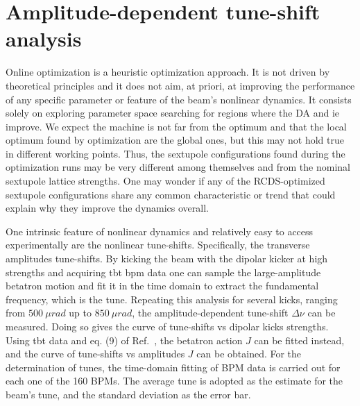 \section{Amplitude-dependent tune-shift analysis}
Online optimization is a heuristic optimization approach. It is not driven by theoretical principles and it does not aim, at priori, at improving the performance of any specific parameter or feature of the beam's nonlinear dynamics. It consists solely on exploring parameter space searching for regions where the \gls*{DA} and \gls*{ie} improve. We expect the machine is not far from the optimum and  that the local optimum found by optimization are the global ones, but this may not hold true in different working points. Thus, the sextupole configurations found during the optimization runs may be very different among themselves and from the nominal sextupole lattice strengths. One may wonder if any of the \gls*{RCDS}-optimized sextupole configurations share any common characteristic or trend that could explain why they improve the dynamics overall.

One intrinsic feature of nonlinear dynamics and relatively easy to access experimentally are the nonlinear tune-shifts. Specifically, the transverse amplitudes tune-shifts. By kicking the beam with the dipolar kicker at high strengths and acquiring \gls*{tbt} \gls*{bpm} data one can sample the large-amplitude betatron motion and fit it in the time domain to extract the fundamental frequency, which is the tune. Repeating this analysis for  several kicks, ranging from $500~\unit{\mu rad}$ up to $850~\unit{\mu rad}$, the amplitude-dependent tune-shift $\Delta\nu$ can be measured. Doing so gives the curve of tune-shifts vs dipolar kicks strengths. Using \gls*{tbt} data and eq. (9) of Ref.~\cite{resende_equilibrium_2021}, the betatron action $J$ can be fitted instead, and the curve of tune-shifts vs amplitudes $J$ can be obtained. For the determination of tunes, the time-domain fitting of BPM data is carried out for each one of the 160 BPMs. The average tune is adopted as the estimate for the beam's tune, and the standard deviation as the error bar.

